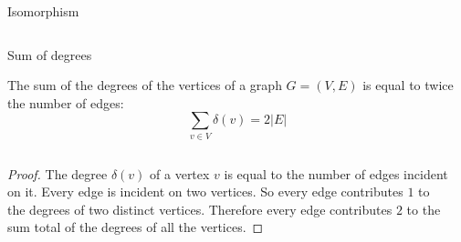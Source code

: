 \begin{frame}{Isomorphism}
\begin{center}
\begin{columns}
      \begin{column}{0.3\textwidth}
      \end{column}
    \end{columns}
  \end{center}

\end{frame}


\begin{frame}{Sum of degrees}

	\begin{theorem}
		The sum of the degrees of the vertices of a graph $G = (V,E)$ is equal to twice the number of edges:
			\[ \sum_{v \in V} \delta (v) = 2 | E | \]
	\end{theorem}

	\begin{columns}
		\begin{column}{0.75\textwidth}
			\begin{proof}
				The degree $\delta (v)$ of a vertex $v$ is equal to the number of edges incident on it.
				Every edge is incident on two vertices.
				So every edge contributes $1$ to the degrees of two distinct vertices.
				Therefore every edge contributes $2$ to the sum total of the degrees of all the vertices.
			\end{proof}
		\end{column}
		\begin{column}{0.2\textwidth}
			\begin{center}
			\end{center}
		\end{column}
	\end{columns}
\end{frame}

